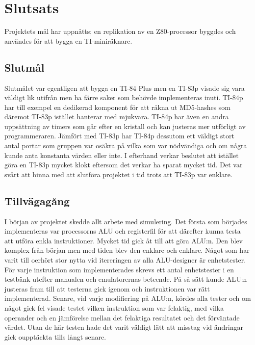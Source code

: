 \documentclass[main.tex]{subfiles}
\begin{document}
\newpage
\section{Slutsats}
Projektets mål har uppnåtts; en replikation av en Z80-processor byggdes och
användes för att bygga en TI-miniräknare. 

\subsection{Slutmål}
Slutmålet var egentligen att bygga en TI-84 Plus men en TI-83p visade sig vara
väldigt lik utifrån men ha färre saker som behövde implementeras inuti. TI-84p
har till exempel en dedikerad komponent för att räkna ut MD5-hashes som däremot
TI-83p istället hanterar med mjukvara. TI-84p har även en andra uppsättning av
timers som går efter en kristall och kan justeras mer utförligt av
programmeraren. Jämfört med TI-83p har TI-84p dessutom ett väldigt stort antal
portar som gruppen var osäkra på vilka som var nödvändiga och om några kunde
anta konstanta värden eller inte. I efterhand verkar beslutet att istället göra
en TI-83p mycket klokt eftersom det verkar ha sparat mycket tid. Det var svårt
att hinna med att slutföra projektet i tid trots att TI-83p var enklare.

\subsection{Tillvägagång}
I början av projektet skedde allt arbete med simulering. Det första som
börjades implementeras var processorns ALU och registerfil för att därefter
kunna testa att utföra enkla instruktioner. Mycket tid gick åt till att göra
ALU:n. Den blev komplex från början men med tiden blev den enklare och enklare.
Något som har varit till oerhört stor nytta vid itereringen av alla
ALU-designer är enhetstester. För varje instruktion som implementerades skrevs
ett antal enhetstester i en testbänk utefter manualen och emulatorernas
beteende. På så sätt kunde ALU:n justeras fram till att testerna gick igenom
och instruktionen var rätt implementerad. Senare, vid varje modifiering på
ALU:n, kördes alla tester och om något gick fel visade testet vilken
instruktion som var felaktig, med vilka operander och en jämförelse mellan det
felaktiga resultatet och det förväntade värdet. Utan de här testen hade det
varit väldigt lätt att misstag vid ändringar gick oupptäckta tills långt
senare.
\end{document}
